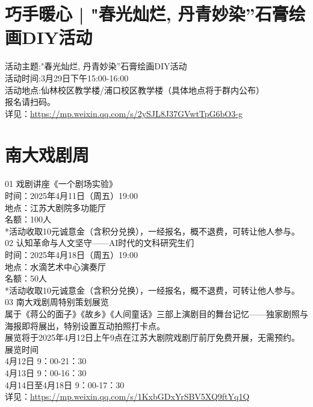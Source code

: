 \documentclass[letterpaper, 12pt]{article}
\begin{document}
\begin{multicols}{2}
\section{巧手暖心 | "春光灿烂, 丹青妙染”石膏绘画DIY活动}
活动主题:"春光灿烂, 丹青妙染”石膏绘画DIY活动
\\活动时间:3月29日下午15:00-16:00
\\活动地点:仙林校区教学楼/浦口校区教学楼（具体地点将于群内公布）
\\报名请扫码。
\\详见：\url{https://mp.weixin.qq.com/s/2ySJL8J37GVwtTpG6bO3-g}

\section{南大戏剧周}
01 戏剧讲座《一个剧场实验》
\\时间：2025年4月11日（周五）19:00
\\地点：江苏大剧院多功能厅
\\名额：100人
\\*活动收取10元诚意金（含积分兑换），一经报名，概不退费，可转让他人参与。
\\02 认知革命与人文坚守——AI时代的文科研究生们
\\时间：2025年4月18日（周五）19:00
\\地点：水滴艺术中心演奏厅
\\名额：50人
\\*活动收取10元诚意金（含积分兑换），一经报名，概不退费，可转让他人参与。
\\03 南大戏剧周特别策划展览
\\属于《蒋公的面子》《故乡》《人间童话》三部上演剧目的舞台记忆——独家剧照与海报即将展出，特别设置互动拍照打卡点。
\\展览将于2025年4月12日上午9点在江苏大剧院戏剧厅前厅免费开展，无需预约。
\\展览时间
\\4月12日 9：00-21：30
\\4月13日 9：00-16：30
\\4月14日至4月18日 9：00-17：30
\\详见：\url{https://mp.weixin.qq.com/s/1KxbGDxYrSBV5XQ9ftYq1Q}



\end{multicols}
\end{document}
